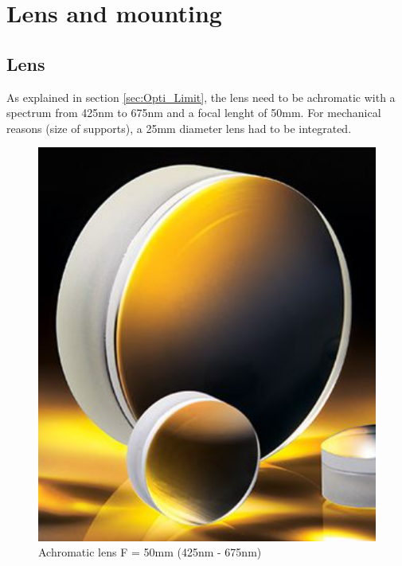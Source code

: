 \section{Lens and mounting}\label{sec:lens}
\subsection{Lens}
As explained in section \ref{sec:Opti_Limit}, the lens need to be achromatic with a spectrum from 425nm to 675nm 
and a focal lenght of 50mm. For mechanical reasons (size of supports), a 25mm diameter lens had to be integrated. 
\begin{figure}[H]
    \centering
    \includegraphics[scale=0.65]{assets/figures/Mechanical Design/Lentille.png}
    \caption{Achromatic lens F = 50mm (425nm - 675nm)}
    \label{fig:Lentille}
\end{figure}

